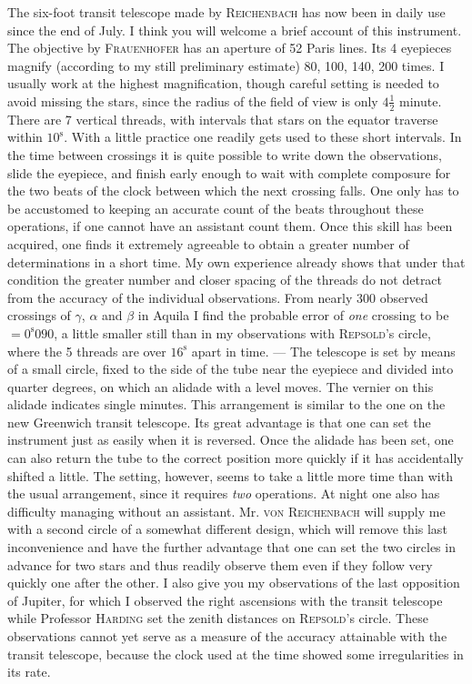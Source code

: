 \par\indent The six-foot transit telescope made by \textsc{Reichenbach} has now been in daily use since the end of July. I think you will welcome a brief account of this instrument. The objective by \textsc{Frauenhofer} has an aperture of 52 Paris lines. Its 4 eyepieces magnify (according to my still preliminary estimate) 80, 100, 140, 200 times. I usually work at the highest magnification, though careful setting is needed to avoid missing the stars, since the radius of the field of view is only $4\tfrac{1}{2}$ minute. There are 7 vertical threads, with intervals that stars on the equator traverse within $10^{\mathrm s}$. With a little practice one readily gets used to these short intervals. In the time between crossings it is quite possible to write down the observations, slide the eyepiece, and finish early enough to wait with complete composure for the two beats of the clock between which the next crossing falls. One only has to be accustomed to keeping an accurate count of the beats throughout these operations, if one cannot have an assistant count them. Once this skill has been acquired, one finds it extremely agreeable to obtain a greater number of determinations in a short time. My own experience already shows that under that condition the greater number and closer spacing of the threads do not detract from the accuracy of the individual observations. From nearly 300 observed crossings of $\gamma$, $\alpha$ and $\beta$ in Aquila I find the probable error of \emph{one} crossing to be $= 0^{\mathrm{s}}090$, a little smaller still than in my observations with \textsc{Repsold}’s circle, where the 5 threads are over $16^{\mathrm{s}}$ apart in time. — The telescope is set by means of a small circle, fixed to the side of the tube near the eyepiece and divided into quarter degrees, on which an alidade with a level moves. The vernier on this alidade indicates single minutes. This arrangement is similar to the one on the new Greenwich transit telescope. Its great advantage is that one can set the instrument just as easily when it is reversed. Once the alidade has been set, one can also return the tube to the correct position more quickly if it has accidentally shifted a little. The setting, however, seems to take a little more time than with the usual arrangement, since it requires \emph{two} operations. At night one also has difficulty managing without an assistant. Mr. \textsc{von Reichenbach} will supply me with a second circle of a somewhat different design, which will remove this last inconvenience and have the further advantage that one can set the two circles in advance for two stars and thus readily observe them even if they follow very quickly one after the other. I also give you my observations of the last opposition of Jupiter, for which I observed the right ascensions with the transit telescope while Professor \textsc{Harding} set the zenith distances on \textsc{Repsold}’s circle. These observations cannot yet serve as a measure of the accuracy attainable with the transit telescope, because the clock used at the time showed some irregularities in its rate.

